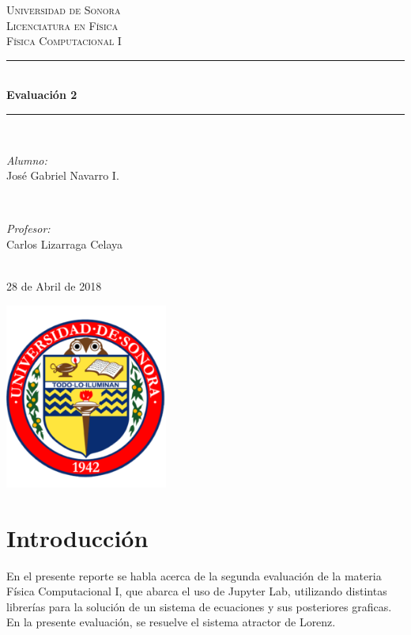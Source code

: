 \documentclass[12pt]{article}
\begin{document}
\begin{titlepage}

\newcommand{\HRule}{\rule{\linewidth}{0.5mm}} 

\center 

\textsc{\LARGE Universidad de Sonora}\\[1.5cm]
\textsc{\Large Licenciatura en Física}\\[0.5cm]
\textsc{\large Física Computacional I}\\[0.5cm]

\HRule \\[0.4cm]
{\huge \bfseries Evaluación 2}\\[0.4cm] 
\HRule \\[1.5cm]

\begin{minipage}{0.4\textwidth}
\begin{flushleft} \large
\emph{Alumno:}\\
José Gabriel Navarro I.
\end{flushleft}
\end{minipage}
~
\begin{minipage}{0.4\textwidth}
\begin{flushright} \large
\emph{Profesor:} \\
Carlos Lizarraga Celaya
\end{flushright}
\end{minipage}\\[2cm]

28 de Abril de 2018

\includegraphics[width=0.4\textwidth]{logo.png}\\
 
\vfill

\end{titlepage}

\section{Introducción}
En el presente reporte se habla acerca de la segunda evaluación de la materia Física Computacional I, que abarca el uso de Jupyter Lab, utilizando distintas librerías para la solución de un sistema de ecuaciones y sus posteriores graficas. En la presente evaluación, se resuelve el sistema atractor de Lorenz. \\
\end{document}
